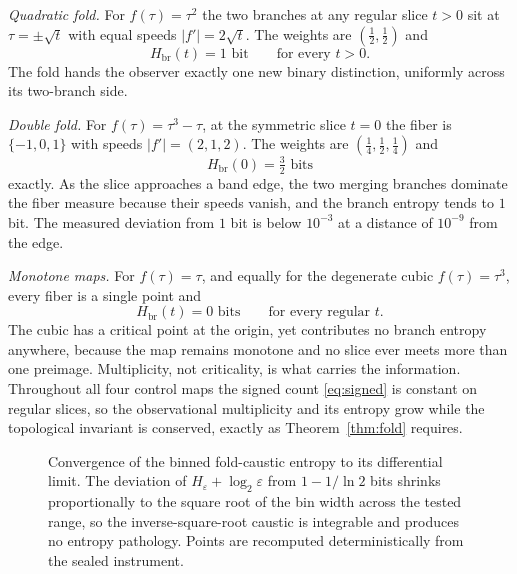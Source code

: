 \documentclass[aps,pre,reprint,nofootinbib]{revtex4-2}
\begin{document}
\emph{Quadratic fold.}  For $f(\tau) = \tau^2$ the two branches at any
regular slice $t > 0$ sit at $\tau = \pm\sqrt{t}$ with equal speeds
$|f'| = 2\sqrt{t}$.  The weights are $(\tfrac12, \tfrac12)$ and
\begin{equation}
  H_{\mathrm{br}}(t) = 1 \text{ bit}
  \qquad \text{for every } t > 0.
\end{equation}
The fold hands the observer exactly one new binary distinction, uniformly
across its two-branch side.

\emph{Double fold.}  For $f(\tau) = \tau^3 - \tau$, at the symmetric slice
$t = 0$ the fiber is $\{-1, 0, 1\}$ with speeds $|f'| = (2, 1, 2)$.  The
weights are $(\tfrac14, \tfrac12, \tfrac14)$ and
\begin{equation}
  H_{\mathrm{br}}(0) = \tfrac{3}{2} \text{ bits}
\end{equation}
exactly.  As the slice approaches a band edge, the two merging branches
dominate the fiber measure because their speeds vanish, and the branch
entropy tends to $1$ bit.  The measured deviation from $1$ bit is below
$10^{-3}$ at a distance of $10^{-9}$ from the edge.

\emph{Monotone maps.}  For $f(\tau) = \tau$, and equally for the degenerate
cubic $f(\tau) = \tau^3$, every fiber is a single point and
\begin{equation}
  H_{\mathrm{br}}(t) = 0 \text{ bits}
  \qquad \text{for every regular } t.
\end{equation}
The cubic has a critical point at the origin, yet contributes no branch
entropy anywhere, because the map remains monotone and no slice ever meets
more than one preimage.  Multiplicity, not criticality, is what carries the
information.  Throughout all four control maps the signed count
\eqref{eq:signed} is constant on regular slices, so the observational
multiplicity and its entropy grow while the topological invariant is
conserved, exactly as Theorem~\ref{thm:fold} requires.

\begin{figure}[t]
\centering
{}
\caption{Convergence of the binned fold-caustic entropy to its
differential limit.  The deviation of $H_{\varepsilon}+\log_{2}\varepsilon$
from $1-1/\ln 2$ bits shrinks proportionally to the square root of the bin
width across the tested range, so the inverse-square-root caustic is
integrable and produces no entropy pathology.  Points are recomputed
deterministically from the sealed instrument.}
\label{fig:convergence}
\end{figure}
\end{document}
